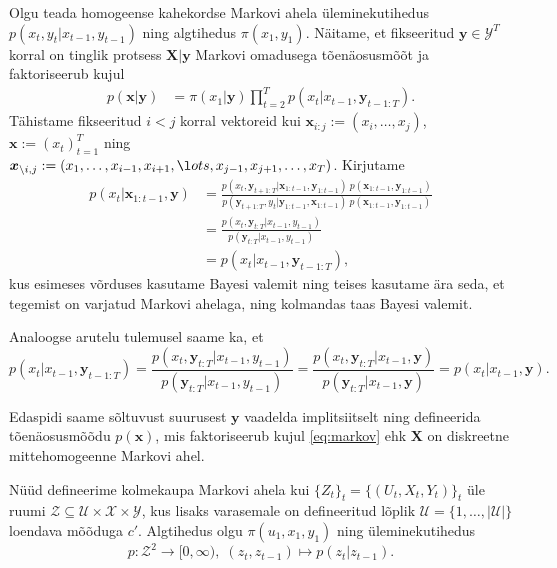 Olgu teada homogeense kahekordse Markovi ahela üleminekutihedus $p(x_t, y_t | x_{t-1}, y_{t-1})$ ning algtihedus $\pi (x_1, y_1)$. Näitame, et fikseeritud $\bm{y}\in \mathcal{Y}^T$ korral on tinglik protsess $\bm{X}|\bm{y}$ Markovi omadusega tõenäosusmõõt ja faktoriseerub kujul
\begin{align}
    \label{eq:markov}
    p(\bm{x}|\bm{y}) &=  \pi (x_1|\bm{y}) \prod_{t=2}^T p(x_t | x_{t-1}, \bm{y}_{t-1:T}).
\end{align}
Tähistame fikseeritud $i < j$ korral vektoreid kui $\bm{x}_{i:j} := (x_i,\ldots,x_j)$, $\bm{x} := (x_t)_{t=1}^T$ ning \\
$\bm{x}_{\backslash i, j} := (x_1,\ldots,x_{i-1},x_{i+1},\l
ots,x_{j-1},x_{j+1},\ldots,x_T)$. Kirjutame
\begin{align*}
    p(x_{t} | \bm{x}_{1:t-1}, \bm{y}) &= \frac{p(x_t, \bm{y}_{t+1:T} | \bm{x}_{1:t-1}, \bm{y}_{1:t-1}) \ p(\bm{x}_{1:t-1}, \bm{y}_{1:t-1})}{p(\bm{y}_{t+1:T}, y_t | \bm{y}_{1:t-1}, \bm{x}_{1:t-1}) \ p(\bm{x}_{1:t-1}, \bm{y}_{1:t-1})}\\
    &= \frac{p(x_t, \bm{y}_{t:T} | x_{t-1}, y_{t-1})}{p(\bm{y}_{t:T} | x_{t-1}, y_{t-1})} \\
    &= p(x_t | x_{t-1}, \bm{y}_{t-1:T}),
\end{align*}
kus esimeses võrduses kasutame Bayesi valemit ning teises kasutame ära seda, et tegemist on varjatud Markovi ahelaga, ning kolmandas taas Bayesi valemit.

Analoogse arutelu tulemusel saame ka, et
\begin{equation*}
    p(x_t | x_{t-1}, \bm{y}_{t-1:T}) = \frac{p(x_t, \bm{y}_{t:T} | x_{t-1}, y_{t-1})}{p(\bm{y}_{t:T} | x_{t-1}, y_{t-1})} = \frac{p(x_t, \bm{y}_{t:T} | x_{t-1}, \bm{y})}{p(\bm{y}_{t:T} | x_{t-1}, \bm{y})} = p(x_{t} | x_{t-1}, \bm{y}).
\end{equation*}

Edaspidi saame sõltuvust suurusest $\bm{y}$ vaadelda implitsiitselt ning defineerida tõenäosusmõõdu $p(\bm{x})$, mis faktoriseerub kujul \eqref{eq:markov} ehk $\bm{X}$ on diskreetne mittehomogeenne Markovi ahel.

Nüüd defineerime kolmekaupa Markovi ahela kui $\{Z_t\}_{t} = \{(U_t,X_t,Y_t)\}_{t}$ üle ruumi $\mathcal{Z} \subseteq \mathcal{U} \times \mathcal{X} \times \mathcal{Y}$, kus lisaks varasemale on defineeritud lõplik $\mathcal{U} = \{1,\ldots,|\mathcal{U|}\}$ loendava mõõduga $c'$. Algtihedus olgu $\pi(u_1,x_1,y_1)$ ning üleminekutihedus 
$$p: \mathcal{Z}^2 \rightarrow [0,\infty),\; (z_t,z_{t-1}) \mapsto p(z_t|z_{t-1}).$$

